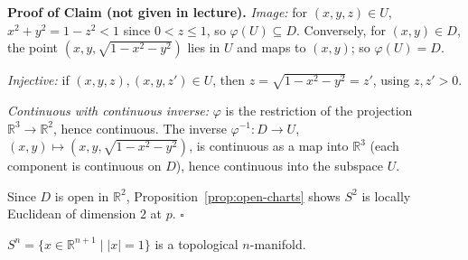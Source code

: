 \documentclass[11pt]{report}
\makeatletter
\newcounter{thmcounter}[section]
\renewenvironment{proof}[1][Proof]{\noindent\textbf{#1.} }{\hfill$\square$\par\vspace{5pt}}
\newcommand{\thmlabel}[1]{\edef\@currentlabel{\arabic{section}.\arabic{thmcounter}}\label{#1}}
\newcommand{\leeref}[1]{\par\smallskip{\raggedleft\footnotesize\textsc{Lee}:\ #1\par}}
\makeatother
\begin{document}
\begin{proof}[Proof of Claim (not given in lecture)]
\emph{Image:} for $(x, y, z) \in U$, $x^2 + y^2 = 1 - z^2 < 1$ since $0 < z \le 1$, so $\varphi(U) \subseteq D$. Conversely, for $(x, y) \in D$, the point $(x, y, \sqrt{1 - x^2 - y^2})$ lies in $U$ and maps to $(x, y)$; so $\varphi(U) = D$.

\emph{Injective:} if $(x, y, z), (x, y, z') \in U$, then $z = \sqrt{1 - x^2 - y^2} = z'$, using $z, z' > 0$.

\emph{Continuous with continuous inverse:} $\varphi$ is the restriction of the projection $\mathbb{R}^3 \to \mathbb{R}^2$, hence continuous. The inverse $\varphi^{-1} : D \to U$, $(x, y) \mapsto (x, y, \sqrt{1 - x^2 - y^2})$, is continuous as a map into $\mathbb{R}^3$ (each component is continuous on $D$), hence continuous into the subspace $U$.

Since $D$ is open in $\mathbb{R}^2$, Proposition~\ref{prop:open-charts} shows $S^2$ is locally Euclidean of dimension $2$ at $p$.
\end{proof}
\begin{center}
\end{center}


\begin{propbox}\thmlabel{prop:sn-manifold}
$S^n = \{x \in \mathbb{R}^{n+1} \mid |x| = 1\}$ is a topological $n$-manifold.
\leeref{Example 1.4}
\end{propbox}
\end{document}
